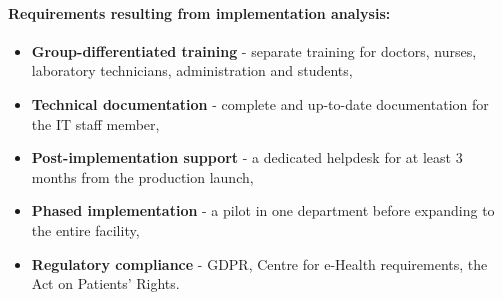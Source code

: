 \paragraph{Requirements resulting from implementation analysis:}
\begin{itemize}
    \item \textbf{Group-differentiated training} - separate training for doctors, nurses, laboratory technicians, administration and students,
    \item \textbf{Technical documentation} - complete and up-to-date documentation for the IT staff member,
    \item \textbf{Post-implementation support} - a dedicated helpdesk for at least 3 months from the production launch,
    \item \textbf{Phased implementation} - a pilot in one department before expanding to the entire facility,
    \item \textbf{Regulatory compliance} - GDPR, Centre for e-Health requirements, the Act on Patients' Rights.
\end{itemize}
